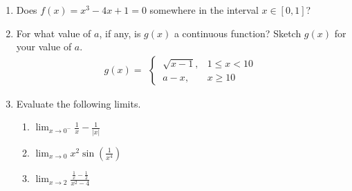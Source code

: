 \begin{enumerate}
    \item Does $f(x) = x^3 -4x + 1 = 0 $ somewhere in the interval $x \in [0,1]$? 
	\item For what value of $a$, if any, is $g(x)$ a continuous function? Sketch $g(x)$ for your value of $a$. 
    $$g(x) = \begin{array}{cc}
    \begin{cases}
      \ \sqrt{x - 1} , & 1 \le x < 10 \\
      \ a - x , & x \geq 10
    \end{cases}
    \end{array}$$
    
    \item Evaluate the following limits.
    \begin{enumerate}
    	\item $\displaystyle{\lim_{x \rightarrow 0^-} \frac 1 x - \frac{1}{|x|}}$
    	\item $\displaystyle{\lim_{x \rightarrow 0} x^2\sin\left(\frac{1}{x^4}\right)}$
    	\item $\displaystyle{\lim_{x \rightarrow 2} \frac{\frac 1 x - \frac 1 2}{x^2 - 4}}$
    \end{enumerate}
     
    
\end{enumerate}    